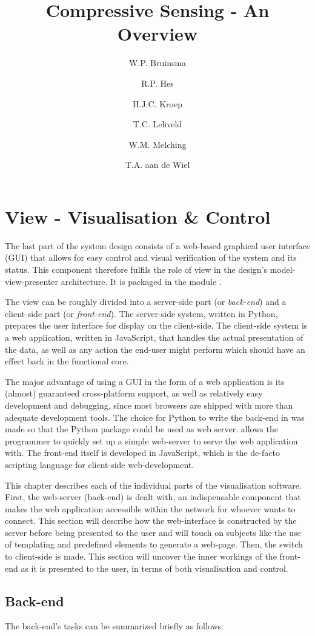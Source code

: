 \documentclass[a4paper, openany, oneside]{memoir}
\title{Compressive Sensing - An Overview}
\author{W.P. Bruinsma \and R.P. Hes \and H.J.C. Kroep \and T.C. Leliveld \and W.M. Melching \and T.A. aan de Wiel}
\begin{document}
\chapter{View - Visualisation \& Control}
\label{ch:visualisation}
The last part of the system design consists of a web-based graphical user interface (GUI) that allows for easy control and visual verification of the system and its status. This component therefore fulfils the role of view in the design's model-view-presenter architecture. It is packaged in the module .

The view can be roughly divided into a server-side part (or \emph{back-end}) and a client-side part (or \emph{front-end}). The server-side system, written in Python, prepares the user interface for display on the client-side. The client-side system is a web application, written in JavaScript, that handles the actual presentation of the data, as well as any action the end-user might perform which should have an effect back in the functional core.

The major advantage of using a GUI in the form of a web application is its (almost) guaranteed cross-platform support, as well as relatively easy development and debugging, since most browsers are shipped with more than adequate development tools.
The choice for Python to write the back-end in was made so that the  Python package could be used as web server.  allows the programmer to quickly set up a simple web-server to serve the web application with.
The front-end itself is developed in JavaScript, which is the de-facto scripting language for client-side web-development.

This chapter describes each of the individual parts of the visualisation software.
First, the web-server (back-end) is dealt with, an indispensable component that makes the web application accessible within the network for whoever wants to connect. This section will describe how the web-interface is constructed by the server before being presented to the user and will touch on subjects like the use of templating and predefined elements to generate a web-page.
Then, the switch to client-side is made. This section will uncover the inner workings of the front-end as it is presented to the user, in terms of both visualisation and control.

\section{Back-end}
\label{sec:webserver}
The back-end's tasks can be summarized briefly as follows:
\end{document}
